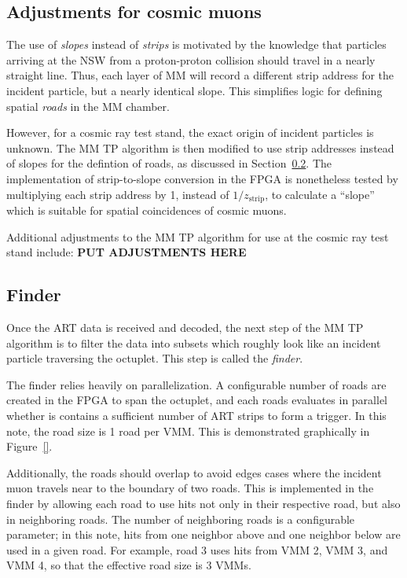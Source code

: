 \subsection{Adjustments for cosmic muons}
\label{sec:alg-crts}

The use of \textit{slopes} instead of \textit{strips} is motivated by the knowledge that particles arriving at the NSW from a proton-proton collision should travel in a nearly straight line. Thus, each layer of MM will record a different strip address for the incident particle, but a nearly identical slope. This simplifies logic for defining spatial \textit{roads} in the MM chamber.

However, for a cosmic ray test stand, the exact origin of incident particles is unknown. The MM TP algorithm is then modified to use strip addresses instead of slopes for the defintion of roads, as discussed in Section~\ref{sec:alg-finder}. The implementation of strip-to-slope conversion in the FPGA is nonetheless tested by multiplying each strip address by 1, instead of $1/z_\text{strip}$, to calculate a ``slope'' which is suitable for spatial coincidences of cosmic muons.

Additional adjustments to the MM TP algorithm for use at the cosmic ray test stand include: \textbf{PUT ADJUSTMENTS HERE}

\subsection{Finder}
\label{sec:alg-finder}

Once the ART data is received and decoded, the next step of the MM TP algorithm is to filter the data into subsets which roughly look like an incident particle traversing the octuplet. This step is called the \textit{finder}.

The finder relies heavily on parallelization. A configurable number of roads are created in the FPGA to span the octuplet, and each roads evaluates in parallel whether is contains a sufficient number of ART strips to form a trigger. In this note, the road size is 1 road per VMM. This is demonstrated graphically in Figure~\ref{}.

Additionally, the roads should overlap to avoid edges cases where the incident muon travels near to the boundary of two roads. This is implemented in the finder by allowing each road to use hits not only in their respective road, but also in neighboring roads. The number of neighboring roads is a configurable parameter; in this note, hits from one neighbor above and one neighbor below are used in a given road. For example, road 3 uses hits from VMM 2, VMM 3, and VMM 4, so that the effective road size is 3 VMMs.

